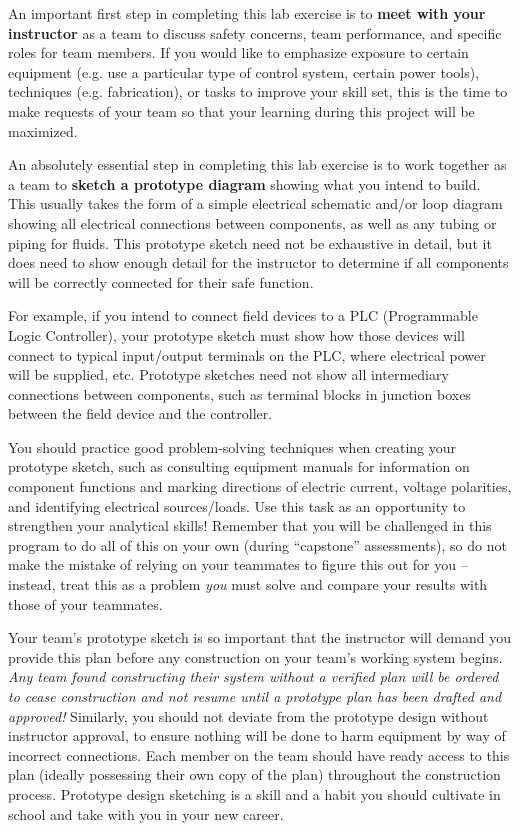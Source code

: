\vskip 5pt

An important first step in completing this lab exercise is to {\bf meet with your instructor} as a team to discuss safety concerns, team performance, and specific roles for team members.  If you would like to emphasize exposure to certain equipment (e.g. use a particular type of control system, certain power tools), techniques (e.g. fabrication), or tasks to improve your skill set, this is the time to make requests of your team so that your learning during this project will be maximized.

\vskip 10pt

An absolutely essential step in completing this lab exercise is to work together as a team to {\bf sketch a prototype diagram} showing what you intend to build.  This usually takes the form of a simple electrical schematic and/or loop diagram showing all electrical connections between components, as well as any tubing or piping for fluids.  This prototype sketch need not be exhaustive in detail, but it does need to show enough detail for the instructor to determine if all components will be correctly connected for their safe function.

For example, if you intend to connect field devices to a PLC (Programmable Logic Controller), your prototype sketch must show how those devices will connect to typical input/output terminals on the PLC, where electrical power will be supplied, etc.  Prototype sketches need not show all intermediary connections between components, such as terminal blocks in junction boxes between the field device and the controller.

You should practice good problem-solving techniques when creating your prototype sketch, such as consulting equipment manuals for information on component functions and marking directions of electric current, voltage polarities, and identifying electrical sources/loads.  Use this task as an opportunity to strengthen your analytical skills!  Remember that you will be challenged in this program to do all of this on your own (during ``capstone'' assessments), so do not make the mistake of relying on your teammates to figure this out for you -- instead, treat this as a problem {\it you} must solve and compare your results with those of your teammates.

Your team's prototype sketch is so important that the instructor will demand you provide this plan before any construction on your team's working system begins.  {\it Any team found constructing their system without a verified plan will be ordered to cease construction and not resume until a prototype plan has been drafted and approved!}  Similarly, you should not deviate from the prototype design without instructor approval, to ensure nothing will be done to harm equipment by way of incorrect connections.  Each member on the team should have ready access to this plan (ideally possessing their own copy of the plan) throughout the construction process.  Prototype design sketching is a skill and a habit you should cultivate in school and take with you in your new career.

